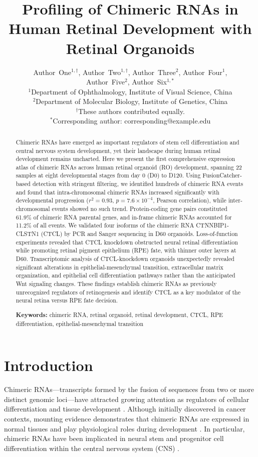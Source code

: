\documentclass[11pt]{article}
\title{Profiling of Chimeric RNAs in Human Retinal Development with Retinal Organoids}
\author{
Author~One$^{1,\dagger}$, Author~Two$^{1,\dagger}$, Author~Three$^{2}$, Author~Four$^{1}$, \\
Author~Five$^{2}$, Author~Six$^{1,*}$ \\[6pt]
$^{1}$Department of Ophthalmology, Institute of Visual Science, China \\
$^{2}$Department of Molecular Biology, Institute of Genetics, China \\[4pt]
$^{\dagger}$These authors contributed equally. \\
$^{*}$Corresponding author: corresponding@example.edu
}
\date{}
\begin{document}
\maketitle

\begin{abstract}
Chimeric RNAs have emerged as important regulators of stem cell differentiation and central nervous system development, yet their landscape during human retinal development remains uncharted. Here we present the first comprehensive expression atlas of chimeric RNAs across human retinal organoid (RO) development, spanning 22 samples at eight developmental stages from day 0 (D0) to D120. Using FusionCatcher-based detection with stringent filtering, we identified hundreds of chimeric RNA events and found that intra-chromosomal chimeric RNAs increased significantly with developmental progression ($r^{2} = 0.93$, $p = 7.6 \times 10^{-4}$, Pearson correlation), while inter-chromosomal events showed no such trend. Protein-coding gene pairs constituted 61.9\% of chimeric RNA parental genes, and in-frame chimeric RNAs accounted for 11.2\% of all events. We validated four isoforms of the chimeric RNA CTNNBIP1-CLSTN1 (CTCL) by PCR and Sanger sequencing in D60 organoids. Loss-of-function experiments revealed that CTCL knockdown obstructed neural retinal differentiation while promoting retinal pigment epithelium (RPE) fate, with thinner outer layers at D60. Transcriptomic analysis of CTCL-knockdown organoids unexpectedly revealed significant alterations in epithelial-mesenchymal transition, extracellular matrix organization, and epithelial cell differentiation pathways rather than the anticipated Wnt signaling changes. These findings establish chimeric RNAs as previously unrecognized regulators of retinogenesis and identify CTCL as a key modulator of the neural retina versus RPE fate decision.

\vspace{0.5em}
\noindent\textbf{Keywords:} chimeric RNA, retinal organoid, retinal development, CTCL, RPE differentiation, epithelial-mesenchymal transition
\end{abstract}

\section{Introduction}

Chimeric RNAs---transcripts formed by the fusion of sequences from two or more distinct genomic loci---have attracted growing attention as regulators of cellular differentiation and tissue development \citep{li2019chimeric, wu2019circular}. Although initially discovered in cancer contexts, mounting evidence demonstrates that chimeric RNAs are expressed in normal tissues and play physiological roles during development \citep{tang2017fusion}. In particular, chimeric RNAs have been implicated in neural stem and progenitor cell differentiation within the central nervous system (CNS) \citep{li2017chimeric_cns, gao2022ctcl}.
\end{document}
